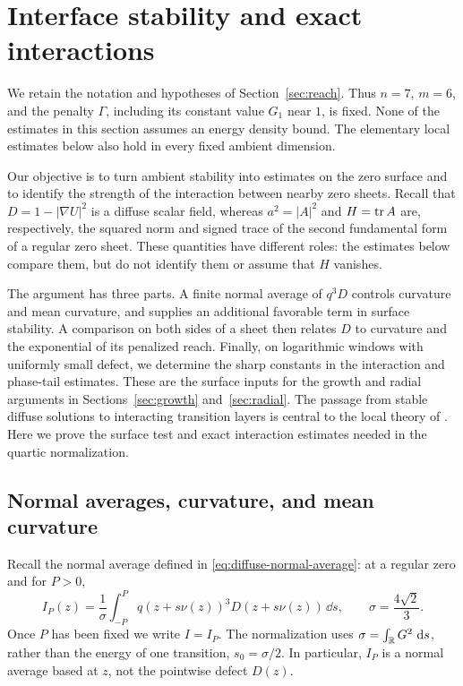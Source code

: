\section{Interface stability and exact interactions}\label{sec:interface}

We retain the notation and hypotheses of Section~\ref{sec:reach}.  Thus
$n=7$, $m=6$, and the penalty $\Gamma$, including its constant value
$G_1$ near $1$, is fixed.  None of the estimates in this section assumes
an energy density bound.  The elementary local estimates below also
hold in every fixed ambient dimension.

Our objective is to turn ambient stability into estimates on the zero
surface and to identify the strength of the interaction between nearby
zero sheets.  Recall that $D=1-|\nabla U|^2$ is a diffuse scalar field,
whereas $a^2=|A|^2$ and $H=\operatorname{tr} A$ are, respectively, the squared norm
and signed trace of the second fundamental form of a regular zero sheet.
These quantities have different roles: the estimates below compare
them, but do not identify them or assume that $H$ vanishes.

The argument has three parts.  A finite normal average of $q^3D$
controls curvature and mean curvature, and supplies an additional
favorable term in surface stability.  A comparison on both sides of a
sheet then relates $D$ to curvature and the exponential of its penalized
reach.  Finally, on logarithmic windows with uniformly small defect,
we determine the sharp constants in the interaction and phase-tail
estimates.  These are the surface inputs for the growth and radial
arguments in Sections~\ref{sec:growth} and~\ref{sec:radial}.
The passage from stable diffuse solutions to interacting transition
layers is central to the local theory of \citet{WangWei2019}.  Here we
prove the surface test and exact interaction estimates needed in the
quartic normalization.

\subsection{Normal averages, curvature, and mean curvature}

Recall the normal average defined in
\eqref{eq:diffuse-normal-average}: at a regular zero and for $P>0$,
\[
 I_P(z)=\frac1\sigma\int_{-P}^{P}
 q(z+s\nu(z))^3D(z+s\nu(z))\,\dd s,
 \qquad \sigma=\frac{4\sqrt2}{3}.
\]
Once $P$ has been fixed we write $I=I_P$.
The normalization uses $\sigma=\int_\mathbb R G^2\,\,\mathrm d s$, rather than the
energy of one transition, $s_0=\sigma/2$.  In particular, $I_P$ is a
normal average based at $z$, not the pointwise defect $D(z)$.

